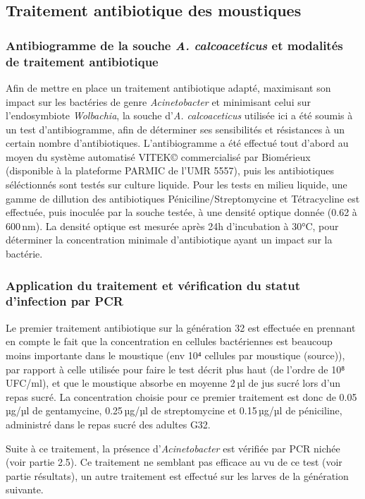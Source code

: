 \subsection{Traitement antibiotique des moustiques}

\subsubsection{Antibiogramme de la souche \textit{A. calcoaceticus} et modalités de traitement antibiotique}

Afin de mettre en place un traitement antibiotique adapté, maximisant son impact sur les bactéries de genre \textit{Acinetobacter} et minimisant celui sur l'endosymbiote \textit{Wolbachia}, la souche d'\textit{A. calcoaceticus} utilisée ici a été soumis à un test d'antibiogramme, afin de déterminer ses sensibilités et résistances à un certain nombre d'antibiotiques.
L'antibiogramme a été effectué tout d'abord au moyen du système automatisé VITEK© commercialisé par Biomérieux (disponible à la plateforme PARMIC de l'UMR 5557), puis les antibiotiques séléctionnés sont testés sur culture liquide.
Pour les tests en milieu liquide, une gamme de dillution des antibiotiques Péniciline/Streptomycine et Tétracycline est effectuée, puis inoculée par la souche testée, à une densité optique donnée (0.62 à 600\,nm).
La densité optique est mesurée après 24h d'incubation à 30°C, pour déterminer la concentration minimale d'antibiotique ayant un impact sur la bactérie.

\subsubsection{Application du traitement et vérification du statut d'infection par PCR}

Le premier traitement antibiotique sur la génération 32 est effectuée en prennant en compte le fait que la concentration en cellules bactériennes est beaucoup moins importante dans le moustique (env 10⁴ cellules par moustique (source)), par rapport à celle utilisée pour faire le test décrit plus haut (de l'ordre de 10⁸ UFC/ml), et que le moustique absorbe en moyenne 2\,µl de jus sucré lors d'un repas sucré.
La concentration choisie pour ce premier traitement est donc de 0.05\,µg/µl de gentamycine, 0.25\,µg/µl de streptomycine et 0.15\,µg/µl de péniciline, administré dans le repas sucré des adultes G32.

Suite à ce traitement, la présence d'\textit{Acinetobacter} est vérifiée par PCR nichée (voir partie 2.5).
Ce traitement ne semblant pas efficace au vu de ce test (voir partie résultats), un autre traitement est effectué sur les larves de la génération suivante.

